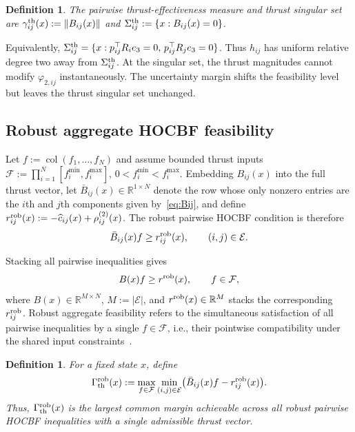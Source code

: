 \documentclass[journal,twoside,web]{ieeecolor}
\newtheorem{definition}[theorem]{Definition}
\begin{document}
 \begin{definition} The pairwise thrust-effectiveness measure and thrust singular set are $\gamma_{ij}^{\rm th}(x):=\|B_{ij}(x)\|$ and $\Sigma_{ij}^{\rm th}:=\{x:B_{ij}(x)=0\}$. \end{definition} 
 
 Equivalently,
$\Sigma_{ij}^{\rm th}
=\{x:p_{ij}^\top R_ie_3=0,\,
p_{ij}^\top R_je_3=0\}$.
Thus $h_{ij}$ has uniform relative degree two away from
$\Sigma_{ij}^{\rm th}$. At the singular set, the thrust
magnitudes cannot modify $\varphi_{2,ij}$ instantaneously.
The uncertainty margin shifts the feasibility level but leaves
the thrust singular set unchanged.
 
\subsection{Robust aggregate HOCBF feasibility}

Let $f:=\operatorname{col}(f_1,\ldots,f_N)$ and assume bounded
thrust inputs
$\displaystyle{\mathcal F:=\prod_{i=1}^N[f_i^{\min},f_i^{\max}]},\,
 0<f_i^{\min}<f_i^{\max}$.
Embedding $B_{ij}(x)$ into the full thrust vector, let
$\bar B_{ij}(x)\in\mathbb R^{1\times N}$ denote the row whose
only nonzero entries are the $i$th and $j$th components
given by~\eqref{eq:Bij}, and define
$r_{ij}^{\rm rob}(x):=
-\widehat c_{ij}(x)+\rho_{ij}^{(2)}(x)$. The robust pairwise HOCBF condition is therefore
\begin{equation}
    \bar B_{ij}(x)f\ge r_{ij}^{\rm rob}(x),
    \qquad (i,j)\in\mathcal E.
    \label{eq:pairwise_affine_constraint}
\end{equation}

Stacking all pairwise inequalities gives
\begin{equation}
    B(x)f\ge r^{\rm rob}(x),
    \qquad f\in\mathcal F,
    \label{eq:aggregate_constraints}
\end{equation}
where $B(x)\in\mathbb R^{M\times N}$,
$M:=|\mathcal E|$, and $r^{\rm rob}(x)\in\mathbb R^M$
stacks the corresponding $r_{ij}^{\rm rob}$. Robust aggregate
feasibility refers to the simultaneous satisfaction of all
pairwise inequalities by a single $f\in\mathcal F$, i.e.,
their pointwise compatibility under the shared input
constraints~\cite{tan2022compatibility}.

\begin{definition}
For a fixed state $x$, define
\begin{equation}
    \Gamma_{\rm th}^{\rm rob}(x)
    :=
    \max_{f\in\mathcal F}
    \min_{(i,j)\in\mathcal E}
    \bigl(
        \bar B_{ij}(x)f-r_{ij}^{\rm rob}(x)
    \bigr).
    \label{eq:Gamma_th_primal}
\end{equation}
Thus, $\Gamma_{\rm th}^{\rm rob}(x)$ is the largest common
margin achievable across all robust pairwise HOCBF
inequalities with a single admissible thrust vector.
\end{definition}
\end{document}
